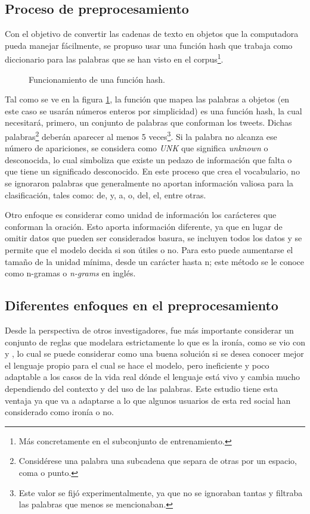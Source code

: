 \subsection{Proceso de preprocesamiento}
\par Con el objetivo de convertir las cadenas de texto en objetos que la computadora pueda manejar fácilmente, se propuso usar una función hash que trabaja como diccionario para las palabras que se han visto en el corpus\footnote{Más concretamente en el subconjunto de entrenamiento.}.
\begin{figure}[h]
	\centering
	
	\caption{Funcionamiento de una función hash.}
	\label{fig:funcionHash}
\end{figure}
\par Tal como se ve en la figura \ref{fig:funcionHash}, la función que mapea las palabras a objetos (en este caso se usarán números enteros por simplicidad) es una función hash, la cual necesitará, primero, un conjunto de palabras que conforman los tweets. Dichas palabras\footnote{Considérese
	una palabra una subcadena que separa de otras por un espacio, coma o punto.} deberán aparecer al menos 5 veces\footnote{Este valor se fijó experimentalmente, ya que no se ignoraban tantas y filtraba las palabras que menos se mencionaban.}. Si la palabra no alcanza ese número de apariciones, se considera como \textit{UNK} que significa \textit{unknown} o desconocida, lo cual simboliza que existe un pedazo de información que falta o que tiene un significado desconocido. En este proceso que crea el vocabulario, no se ignoraron palabras que generalmente no aportan información valiosa para la clasificación, tales como: de, y, a, o, del, el, entre otras.

\par Otro enfoque es considerar como unidad de información los carácteres que conforman la oración. Esto aporta información diferente, ya que en lugar de omitir datos que pueden ser considerados basura, se incluyen todos los datos y se permite que el modelo decida si son útiles o no. Para esto puede aumentarse el tamaño de la unidad mínima, desde un carácter hasta n; este método se le conoce como n-gramas o \textit{n-grams} en inglés.

\subsection{Diferentes enfoques en el preprocesamiento}
\par Desde la perspectiva de otros investigadores, fue más importante considerar un conjunto de reglas que modelara estrictamente lo que es la ironía, como se vio con \textcite{utsumi1996unified} y \textcite{kong2011formalization}, lo cual se puede considerar como una buena solución si se desea conocer mejor el lenguaje propio para el cual se  hace el modelo, pero ineficiente y poco adaptable a los casos de la vida real dónde el lenguaje está vivo y cambia mucho dependiendo del contexto y del uso de las palabras. Este estudio tiene esta ventaja ya que va a adaptarse a lo que algunos usuarios de esta red social han considerado como ironía o no.

